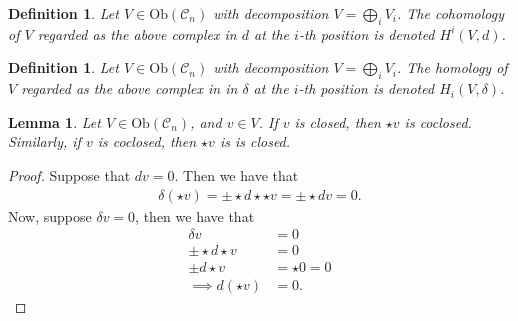 \documentclass{amsart}
\newtheorem{lemma}[theorem]{Lemma}
\newtheorem{definition}[theorem]{Definition}
\theoremstyle{definition}
\begin{document}
\begin{definition}
   Let $V \in \mathrm{Ob}(\mathscr{C}_n)$ with decomposition $V = \bigoplus_i V_i$. The cohomology of $V$ regarded as the above complex in $d$ at the $i$-th position is denoted $H^i(V,d)$.
\end{definition}
\begin{definition}
    Let $V \in \mathrm{Ob}(\mathscr{C}_n)$ with decomposition $V = \bigoplus_i V_i$. The homology of $V$ regarded as the above complex in in $\delta$ at the $i$-th position is denoted $H_i(V,\delta)$.
\end{definition}
\begin{lemma}
Let $V \in \mathrm{Ob}(\mathscr{C}_n)$, and $v \in V$.
    If $v$ is closed, then $\star v$ is coclosed. Similarly, if $v$ is coclosed, then $\star v$ is is closed.
\end{lemma}
\begin{proof}
    Suppose that $dv=0$. Then we have that 
    \begin{align*}
        \delta (\star v) = \pm \star d\star \star v = \pm \star dv =0.
    \end{align*}
    Now, suppose $\delta v =0$, then we have that
    \begin{align*}
        \delta v &= 0 \\
        \pm \star d\star v &= 0 \\
        \pm d \star v &= \star0=0 \\
        \implies d(\star v) &= 0.
    \end{align*}
\end{proof}
\end{document}
